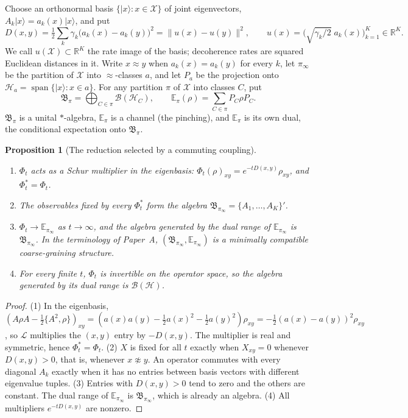 \documentclass[12pt,a4paper]{article}
\newtheorem{proposition}[theorem]{Proposition}
\newcommand{\Hil}{\mathcal H}
\newcommand{\B}{\mathfrak B}
\newcommand{\E}{\mathbb E}
\newcommand{\ket}[1]{|#1\rangle}
\begin{document}
Choose an orthonormal basis $\{\ket{x}:x\in\mathcal X\}$ of joint eigenvectors, $A_k\ket x=a_k(x)\ket x$, and put
\begin{equation}
D(x,y)=\tfrac12\sum_k\gamma_k\bigl(a_k(x)-a_k(y)\bigr)^2=\|u(x)-u(y)\|^2,
\qquad u(x)=\bigl(\sqrt{\gamma_k/2}\;a_k(x)\bigr)_{k=1}^K\in\mathbb R^K .
\label{eq:D}
\end{equation}
We call $u(\mathcal X)\subset\mathbb R^K$ the rate image of the basis; decoherence rates are squared Euclidean distances in it. Write $x\approx y$ when $a_k(x)=a_k(y)$ for every $k$, let $\pi_\infty$ be the partition of $\mathcal X$ into $\approx$-classes $a$, and let $P_a$ be the projection onto $\Hil_a=\operatorname{span}\{\ket x:x\in a\}$. For any partition $\pi$ of $\mathcal X$ into classes $C$, put
\[
\B_\pi=\bigoplus_{C\in\pi}\mathcal B(\Hil_C),\qquad
\E_\pi(\rho)=\sum_{C\in\pi}P_C\rho P_C .
\]
$\B_\pi$ is a unital $*$-algebra, $\E_\pi$ is a channel (the pinching), and $\E_\pi$ is its own dual, the conditional expectation onto $\B_\pi$.

\begin{proposition}[The reduction selected by a commuting coupling]
\label{prop:selected}
\begin{enumerate}
\item $\Phi_t$ acts as a Schur multiplier in the eigenbasis: $\Phi_t(\rho)_{xy}=e^{-tD(x,y)}\rho_{xy}$, and $\Phi_t^*=\Phi_t$.
\item The observables fixed by every $\Phi_t^*$ form the algebra $\B_{\pi_\infty}=\{A_1,\dots,A_K\}'$.
\item $\Phi_t\to\E_{\pi_\infty}$ as $t\to\infty$, and the algebra generated by the dual range of $\E_{\pi_\infty}$ is $\B_{\pi_\infty}$. In the terminology of Paper~A, $(\B_{\pi_\infty},\E_{\pi_\infty})$ is a minimally compatible coarse-graining structure.
\item For every finite $t$, $\Phi_t$ is invertible on the operator space, so the algebra generated by its dual range is $\mathcal B(\Hil)$.
\end{enumerate}
\end{proposition}

\begin{proof}
(1) In the eigenbasis, $(A\rho A-\frac12\{A^2,\rho\})_{xy}=(a(x)a(y)-\frac12a(x)^2-\frac12a(y)^2)\rho_{xy}=-\frac12(a(x)-a(y))^2\rho_{xy}$, so $\mathcal L$ multiplies the $(x,y)$ entry by $-D(x,y)$. The multiplier is real and symmetric, hence $\Phi_t^*=\Phi_t$. (2) $X$ is fixed for all $t$ exactly when $X_{xy}=0$ whenever $D(x,y)>0$, that is, whenever $x\not\approx y$. An operator commutes with every diagonal $A_k$ exactly when it has no entries between basis vectors with different eigenvalue tuples. (3) Entries with $D(x,y)>0$ tend to zero and the others are constant. The dual range of $\E_{\pi_\infty}$ is $\B_{\pi_\infty}$, which is already an algebra. (4) All multipliers $e^{-tD(x,y)}$ are nonzero.
\end{proof}
\end{document}
